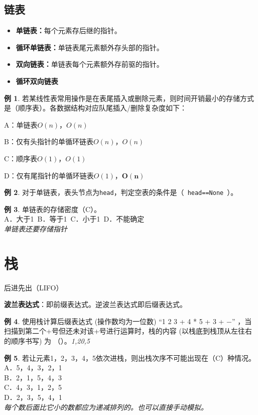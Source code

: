 \documentclass[hyperref,a4paper,UTF8,12pt]{ctexart}
\theoremstyle{definition}
\newtheorem{example}{例}[section]
\begin{document}
\subsection{链表}
\begin{itemize}
    \item \textbf{单链表：}每个元素存后继的指针。
    \item \textbf{循环单链表：}单链表尾元素额外存头部的指针。
    \item \textbf{双向链表：}单链表每个元素额外存前驱的指针。
    \item \textbf{循环双向链表}
\end{itemize}
\begin{example}
若某线性表常用操作是在表尾插入或删除元素，则时间开销最小的存储方式是（顺序表）。各数据结构对应队尾插入/删除复杂度如下：

A：单链表\quad $O(n)$，$O(n)$

B：仅有头指针的单循环链表\quad $O(n)$，$O(n)$

C：顺序表\quad $O(1)$，$O(1)$

D：仅有尾指针的单循环链表\quad $O(1)$，$\bm{O(n)}$

\end{example}
\begin{example}
    对于单链表，表头节点为\verb|head|，判定空表的条件是（\ \verb|head==None|\ ）。
\end{example}
\begin{example}
    单链表的存储密度（C）。\\
A．大于1\ B．等于1\   C．小于1\  D．不能确定\\
\textit{单链表还要存储指针}
\end{example}

\section{栈}
后进先出（LIFO）

\textbf{波兰表达式}：即前缀表达式。逆波兰表达式即后缀表达式。
\begin{example}
    使用栈计算后缀表达式 (操作数均为一位数) “1 2 3 + 4 * 5 + 3 + −” ，当扫描到第二个+号但还未对该+号进行运算时，栈的内容 (以栈底到栈顶从左往右的顺序书写) 为 （\quad）。\textit{1,20,5}
\end{example}
\begin{example}
    若让元素1，2，3，4，5依次进栈，则出栈次序不可能出现在（C）种情况。\\
A．5，4，3，2，1\\  B．2，1，5，4，3\\   C．4，3，1，2，5\\   D．2，3，5，4，1\\
\textit{每个数后面比它小的数都应为递减排列的。也可以直接手动模拟。}
\end{example}
\end{document}
